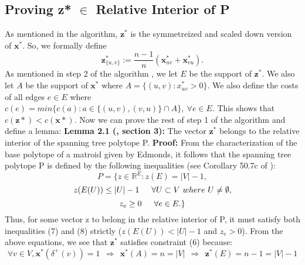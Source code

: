 \documentclass[oneside]{projectpaper} %
\begin{document}
\subsection{Proving z* $\in$ Relative Interior of P}
\indent As mentioned in the algorithm, $\textbf{z}^*$ is the symmetreized and scaled down version of $\textbf{x}^*$. So, we formally define
\begin{equation}
 \textbf{z}_{\{u, v\}}^{*} := \frac{n-1}{n}(\textbf{x}_{uv}^* + \textbf{x}_{vu}^*).
\end{equation}
\indent As mentioned in step 2 of the algorithm , we let $E$ be the support of $\textbf{z}^*$. We also let $A$ be the support of $\textbf{x}^*$ where $A = \{(u, v) : x_{uv}^{*} > 0 \}$. We also define the costs of all edges $e \in E$ where $c(e) = min \{c(a) : a \in \{(u, v), (v, u)\} \cap A \}, \ \forall e \in E$. This shows that $c(\textbf{z}*) < c(\textbf{x}*)$. Now we can prove the rest of step 1 of the algorithm and define a lemma:
\newline
\newline
\textbf{Lemma 2.1 (\cite{AGM10}, section 3):} The vector $\textbf{z}^*$ belongs to the relative interior of the spanning tree polytope P.
\newline
\newline
\textbf{Proof:} From the characterization of the base polytope of a matroid given by Edmonds\cite{Edm71}, it follows that the spanning tree polytope P is defined by the following inequalities (see Corollary 50.7c of \cite{Sch03}):
\begin{equation}
P = \{z \in \mathbb{R}^E : z(E) = |V| - 1,
\end{equation}
\begin{equation}
z(E(U)) \leq |U| - 1 \indent \forall U \subset V \ where \ U \neq \emptyset,
\end{equation}
\begin{equation}
z_e \geq 0 \indent \forall e \in E.\}
\end{equation}
Thus, for some vector z to belong in the relative interior of P, it must satisfy both inequalities (7) and (8) strictly ($z(E(U)) < |U| - 1$ and $z_e > 0$). \newline
From the above equations, we see that $\textbf{z}^*$ satisfies constraint (6) because:
\begin{equation*}
\forall v \in V, \textbf{x}^*(\delta^+(v)) = 1 \ \ \Rightarrow \ \ \textbf{x}^*(A) = n = |V| \ \ \Rightarrow \ \ \textbf{z}^*(E) = n - 1 = |V| - 1
\end{equation*}
\end{document}
